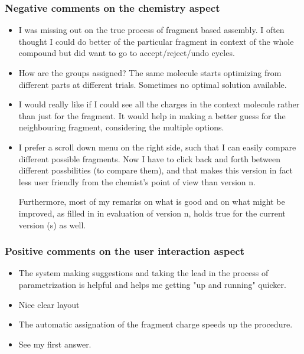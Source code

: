 \subsubsection{Negative comments on the chemistry aspect}
\begin{itemize}
\item I was missing out on the true process of fragment based assembly. I often thought I could do better of the particular fragment in context of the whole compound but did want to go to accept/reject/undo cycles. 

\item How are the groups assigned? The same molecule starts optimizing from different parts at different trials. Sometimes no optimal solution available. 

\item I would really like if I could see all the charges in the context molecule rather than just for the fragment. It would help in making a better guess for the neighbouring fragment, considering the multiple options. 

\item I prefer a scroll down menu on the right side, such that I can easily compare different possible fragments. Now I have to click back and forth between different possbilities (to compare them), and that makes this version in fact less user friendly from the chemist's point of view than version n.


Furthermore, most of my remarks on what is good and on what might be improved, as filled in in evaluation of version n, holds true for the current version (s) as well.

\end{itemize}


\subsubsection{Positive comments on the user interaction aspect}
\begin{itemize}
\item The system making suggestions and taking the lead in the process of parametrization is helpful and helps me getting "up and running" quicker. 




\item Nice clear layout

\item The automatic assignation of the fragment charge speeds up the procedure.

\item See my first answer.

\end{itemize}



